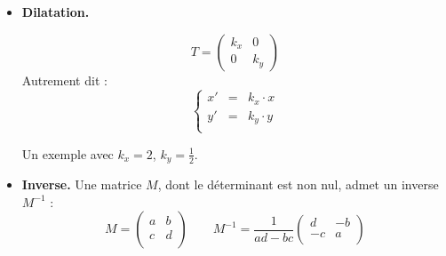 \documentclass[11pt,class=report,crop=false]{standalone}
\begin{document}
\begin{cours}
\begin{itemize}

\medskip

	\item \textbf{Dilatation.}
	
	$$T = \begin{pmatrix}k_x&0\\0&k_y\end{pmatrix}$$
	Autrement dit :
	$$\left\{\begin{array}{rcl}
	x' &=& k_x \cdot x\\
	y' &=& k_y \cdot y\\
	\end{array}\right.$$

Un exemple avec $k_x = 2$, $k_y = \frac12$.

\medskip


\medskip
			
	\item \textbf{Inverse.}
	Une matrice $M$, dont le déterminant est non nul, admet un inverse $M^{-1}$ :
	$$M = \begin{pmatrix}	a & b \\	c & d \\\end{pmatrix} \qquad
	M^{-1} = \frac{1}{ad-bc}\begin{pmatrix}d & -b \\-c & a \\\end{pmatrix}$$

\medskip
	
	
	
%
%
	
\end{itemize}	

\end{cours}

\end{document}
